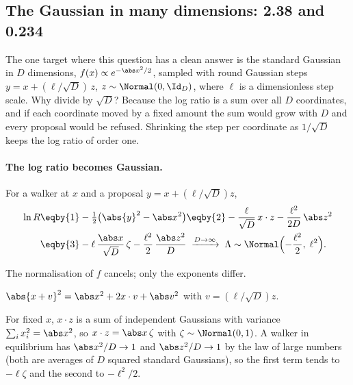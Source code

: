 \subsection{The Gaussian in many dimensions: 2.38 and 0.234}
\label{9b:sec:0234}

The one target where this question has a clean answer is the standard Gaussian in $D$
dimensions, $f(x)\propto e^{-\abs x^2/2}$, sampled with round Gaussian steps
$y=x+(\ell/\sqrt D)\,z$, $z\sim\Normal(0,\Id_D)$, where $\ell$ is a dimensionless step scale.
Why divide by $\sqrt D$? Because the log ratio is a sum over all $D$ coordinates, and if each
coordinate moved by a fixed amount the sum would grow with $D$ and every proposal would be
refused. Shrinking the step per coordinate as $1/\sqrt D$ keeps the log ratio of order one.

\paragraph{The log ratio becomes Gaussian.}
For a walker at $x$ and a proposal $y=x+(\ell/\sqrt D)z$,
\begin{align}
  \ln R
  &\eqby{1}-\tfrac12\bigl(\abs{y}^2-\abs x^2\bigr)
   \eqby{2}-\frac{\ell}{\sqrt D}\,x\cdot z-\frac{\ell^2}{2D}\,\abs z^2
  \nonumber\\
  &\eqby{3}-\ell\,\frac{\abs x}{\sqrt D}\,\zeta-\frac{\ell^2}{2}\,\frac{\abs z^2}{D}
   \;\xrightarrow{D\to\infty}\;
   \Lambda\sim\Normal\Bigl(-\frac{\ell^2}2,\;\ell^2\Bigr).
  \label{9b:eq:logR-gauss}
\end{align}
\begin{explain}
  \item The normalisation of $f$ cancels; only the exponents differ.
  \item $\abs{x+v}^2=\abs x^2+2x\cdot v+\abs v^2$ with $v=(\ell/\sqrt D)z$.
  \item For fixed $x$, $x\cdot z$ is a sum of independent Gaussians with variance
        $\sum_ix_i^2=\abs x^2$, so $x\cdot z=\abs x\,\zeta$ with $\zeta\sim\Normal(0,1)$. A walker
        in equilibrium has $\abs x^2/D\to1$ and $\abs z^2/D\to1$ by the law of large numbers
        (both are averages of $D$ squared standard Gaussians), so the first term tends to
        $-\ell\zeta$ and the second to $-\ell^2/2$.
\end{explain}

